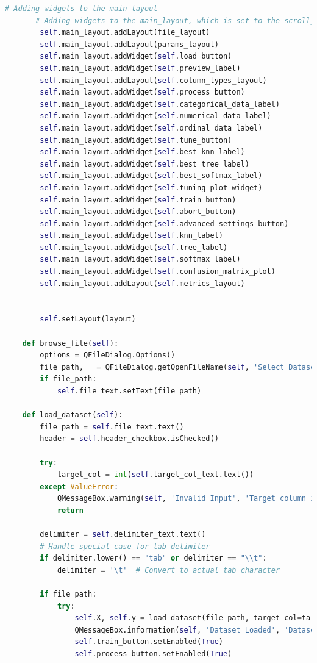 \documentclass[letterpaper,10pt]{article}
\begin{document}
\begin{lstlisting}[language=Python, caption=ui.py - Final structure after refactoring. ]
        # Adding widgets to the main layout
       # Adding widgets to the main_layout, which is set to the scroll_widget
        self.main_layout.addLayout(file_layout)
        self.main_layout.addLayout(params_layout)
        self.main_layout.addWidget(self.load_button)
        self.main_layout.addWidget(self.preview_label)
        self.main_layout.addLayout(self.column_types_layout)
        self.main_layout.addWidget(self.process_button)
        self.main_layout.addWidget(self.categorical_data_label)
        self.main_layout.addWidget(self.numerical_data_label)
        self.main_layout.addWidget(self.ordinal_data_label)
        self.main_layout.addWidget(self.tune_button)
        self.main_layout.addWidget(self.best_knn_label)
        self.main_layout.addWidget(self.best_tree_label)
        self.main_layout.addWidget(self.best_softmax_label)
        self.main_layout.addWidget(self.tuning_plot_widget)
        self.main_layout.addWidget(self.train_button)
        self.main_layout.addWidget(self.abort_button)
        self.main_layout.addWidget(self.advanced_settings_button)
        self.main_layout.addWidget(self.knn_label)
        self.main_layout.addWidget(self.tree_label)
        self.main_layout.addWidget(self.softmax_label)
        self.main_layout.addWidget(self.confusion_matrix_plot)
        self.main_layout.addLayout(self.metrics_layout)


        self.setLayout(layout)
    
    def browse_file(self):
        options = QFileDialog.Options()
        file_path, _ = QFileDialog.getOpenFileName(self, 'Select Dataset File', '', 'All Files (*)', options=options)
        if file_path:
            self.file_text.setText(file_path)
    
    def load_dataset(self):
        file_path = self.file_text.text()
        header = self.header_checkbox.isChecked()
        
        try:
            target_col = int(self.target_col_text.text())
        except ValueError:
            QMessageBox.warning(self, 'Invalid Input', 'Target column index must be an integer.')
            return
        
        delimiter = self.delimiter_text.text()
        # Handle special case for tab delimiter
        if delimiter.lower() == "tab" or delimiter == "\\t":
            delimiter = '\t'  # Convert to actual tab character
        
        if file_path:
            try:
                self.X, self.y = load_dataset(file_path, target_col=target_col, sep=delimiter, header=header)
                QMessageBox.information(self, 'Dataset Loaded', 'Dataset has been loaded successfully.')
                self.train_button.setEnabled(True)
                self.process_button.setEnabled(True)


\end{lstlisting}
\end{document}
